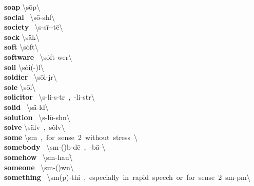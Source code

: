 \documentclass[10pt,a4paper]{article}
\begin{document}
\begin{multicols}{2}
\textbf{ soap }\quad \textbackslash \textprimstress s\={o}p\textbackslash \\
\textbf{ social }\quad \ \textbackslash \textprimstress s\={o}-sh\textschwa l\textbackslash \\
\textbf{ society }\quad \ \textbackslash s\textschwa -\textprimstress s\={i}-\textschwa -t\={e}\textbackslash \\
\textbf{ sock }\quad \textbackslash \textprimstress s\"{a}k\textbackslash \\
\textbf{ soft }\quad \textbackslash \textprimstress s\.{o}ft\textbackslash \\
\textbf{ software }\quad \ \textbackslash \textprimstress s\.{o}ft-\textsecstress wer\textbackslash \\
\textbf{ soil }\quad \textbackslash \textprimstress s\.{o}i(-\textschwa )l\textbackslash \\
\textbf{ soldier }\quad \ \textbackslash \textprimstress s\={o}l-j\textschwa r\textbackslash \\
\textbf{ sole }\quad \textbackslash \textprimstress s\={o}l\textbackslash \\
\textbf{ solicitor }\quad \ \textbackslash s\textschwa -\textprimstress li-s\textschwa -t\textschwa r\ ,\ -\textprimstress li-st\textschwa r\textbackslash \\
\textbf{ solid }\quad \ \textbackslash \textprimstress s\"{a}-l\textschwa d\textbackslash \\
\textbf{ solution }\quad \ \textbackslash s\textschwa -\textprimstress l\"{u}-sh\textschwa n\textbackslash \\
\textbf{ solve }\quad \textbackslash \textprimstress s\"{a}lv\ ,\ \textprimstress s\.{o}lv\textbackslash \\
\textbf{ some }\quad \textbackslash \textprimstress s\textschwa m\ ,\ for\ sense\ 2\ without\ stress\ \textbackslash \\
\textbf{ somebody }\quad \ \textbackslash \textprimstress s\textschwa m-(\textsecstress )b\textschwa -d\={e}\ ,\ -\textsecstress b\"{a}-\textbackslash \\
\textbf{ somehow }\quad \ \textbackslash \textprimstress s\textschwa m-\textsecstress hau\. \textbackslash \\
\textbf{ someone }\quad \ \textbackslash \textprimstress s\textschwa m-(\textsecstress )w\textschwa n\textbackslash \\
\textbf{ something }\quad \ \textbackslash \textprimstress s\textschwa m(p)-thi\engma \ ,\ especially\ in\ rapid\ speech\ or\ for\ sense\ 2\ \textprimstress s\textschwa m-p\textsuperscript{\textreve}m\textbackslash \\

\end{multicols}
\end{document}

